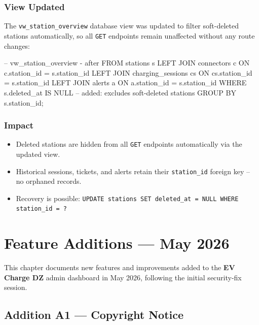 \documentclass[12pt,a4paper]{report}
\begin{document}
	\subsection*{View Updated}
	
	The \texttt{vw\_station\_overview} database view was updated to filter
	soft-deleted stations automatically, so all \texttt{GET} endpoints remain
	unaffected without any route changes:
	
	\begin{codebox}
		-- vw_station_overview - after
		FROM stations s
		LEFT JOIN connectors c        ON c.station_id  = s.station_id
		LEFT JOIN charging_sessions cs ON cs.station_id = s.station_id
		LEFT JOIN alerts a             ON a.station_id  = s.station_id
		WHERE s.deleted_at IS NULL     -- added: excludes soft-deleted stations
		GROUP BY s.station_id;
	\end{codebox}
	
	\subsection*{Impact}
	\begin{itemize}
		\item Deleted stations are hidden from all \texttt{GET} endpoints automatically via the updated view.
		\item Historical sessions, tickets, and alerts retain their \texttt{station\_id} foreign key -- no orphaned records.
		\item Recovery is possible: \texttt{UPDATE stations SET deleted\_at = NULL WHERE station\_id = ?}
	\end{itemize}
	
	\chapter{Feature Additions --- May 2026}

	This chapter documents new features and improvements added to the
	\textbf{EV Charge DZ} admin dashboard in May 2026, following the
	initial security-fix session.

	\section{Addition A1 --- Copyright Notice}
\end{document}
